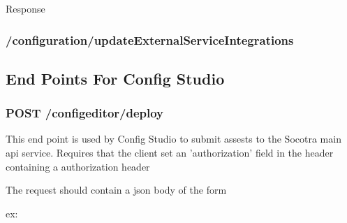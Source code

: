 Response

\begin{Shaded}
\begin{Highlighting}[]
\FunctionTok{\{}
    \FunctionTok{:} \FunctionTok{,}
    \FunctionTok{:} \FunctionTok{,}
    \FunctionTok{:} \FunctionTok{,}
    \FunctionTok{:} 
\FunctionTok{\}}
\end{Highlighting}
\end{Shaded}

\hypertarget{configurationupdateexternalserviceintegrations}{%
\subsubsection{/configuration/updateExternalServiceIntegrations}\label{configurationupdateexternalserviceintegrations}}

\hypertarget{end-points-for-config-studio}{%
\subsection{End Points For Config
Studio}\label{end-points-for-config-studio}}

\hypertarget{post-configeditordeploy}{%
\subsubsection{POST
/configeditor/deploy}\label{post-configeditordeploy}}

This end point is used by Config Studio to submit assests to the Socotra
main api service. Requires that the client set an 'authorization' field
in the header containing a authorization header

The request should contain a json body of the form

\begin{Shaded}
\begin{Highlighting}[]
\FunctionTok{\{}
    \FunctionTok{:} \FunctionTok{,} 
    \FunctionTok{:} 
\FunctionTok{\}}
\end{Highlighting}
\end{Shaded}

ex:

